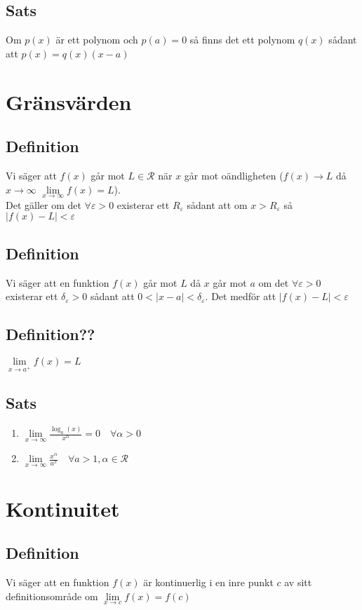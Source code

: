 \documentclass{article}
\begin{document}
\subsection{Sats}
Om $p(x)$ är ett polynom och $p(a)=0$ så finns det ett polynom $q(x)$ sådant att $p(x)=q(x)(x-a)$

\section{Gränsvärden}
\subsection{Definition}
Vi säger att $f(x)$ går mot $L\in \mathcal{R}$ när $x$ går mot oändligheten ($f(x) \to L$ då $x \rightarrow \infty$ $\lim\limits_{x \to\infty} f(x)=L$).\\
Det gäller om det $\forall\varepsilon>0$ existerar ett $R_{\varepsilon}$ sådant att om $x>R_{\varepsilon}$ så $|f(x)-L|<\varepsilon$

\subsection{Definition}
Vi säger att en funktion $f(x)$ går mot $L$ då $x$ går mot $a$ om det $\forall\varepsilon>0$ existerar ett $\delta_{\varepsilon}>0$ sådant att $0<|x-a|<\delta_{\varepsilon}$. Det medför att $|f(x)-L|<\varepsilon$

\subsection{Definition??}
$\lim\limits_{x\to a^{+}} f(x) = L$

\subsection{Sats}
\begin{enumerate}
   \item $\lim\limits_{x\to\infty}\frac{\log_a(x)}{x^\alpha}=0 \quad \forall\alpha > 0$
   \item $\lim\limits_{x\to\infty}\frac{x^\alpha}{a^x}\quad \forall a>1,\alpha \in \mathcal{R}$
\end{enumerate}

\section{Kontinuitet}
\subsection{Definition}
Vi säger att en funktion $f(x)$ är kontinuerlig i en inre punkt $c$ av sitt definitionsområde om $\lim\limits_{x\to c}f(x)=f(c)$
\end{document}
